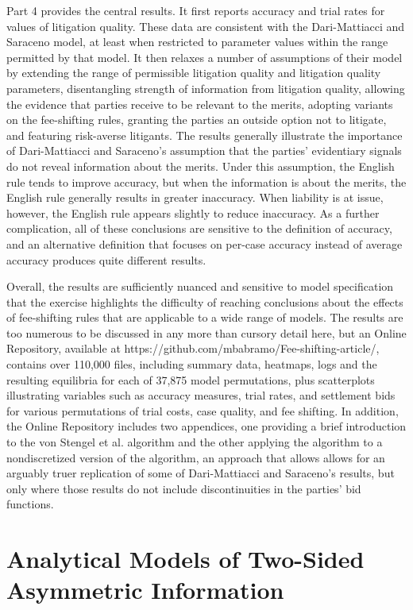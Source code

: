 \documentclass{article}
\begin{document}
Part 4 provides the central results. It first reports accuracy and trial rates for values of litigation quality. These data are consistent with the Dari-Mattiacci and Saraceno model, at least when restricted to parameter values within the range permitted by that model. It then relaxes a number of assumptions of their model by extending the range of permissible litigation quality and litigation quality parameters, disentangling strength of information from litigation quality, allowing the evidence that parties receive to be relevant to the merits, adopting variants on the fee-shifting rules, granting the parties an outside option not to litigate, and featuring risk-averse litigants. The results generally illustrate the importance of Dari-Mattiacci and Saraceno's assumption that the parties' evidentiary signals do not reveal information about the merits. Under this assumption, the English rule tends to improve accuracy, but when the information is about the merits, the English rule generally results in greater inaccuracy. When liability is at issue, however, the English rule appears slightly to reduce inaccuracy. As a further complication, all of these conclusions are sensitive to the definition of accuracy, and an alternative definition that focuses on per-case accuracy instead of average accuracy produces quite different results. 

Overall, the results are sufficiently nuanced and sensitive to model specification that the exercise highlights the difficulty of reaching conclusions about the effects of fee-shifting rules that are applicable to a wide range of models. The results are too numerous to be discussed in any more than cursory detail here, but an Online Repository, available at https://github.com/mbabramo/Fee-shifting-article/, contains over 110,000 files, including summary data, heatmaps, logs and the resulting equilibria for each of 37,875 model permutations, plus scatterplots illustrating variables such as accuracy measures, trial rates, and settlement bids for various permutations of trial costs, case quality, and fee shifting. In addition, the Online Repository includes two appendices, one providing a brief introduction to the von Stengel et al. algorithm and the other applying the algorithm to a nondiscretized version of the algorithm, an approach that allows allows for an arguably truer replication of some of Dari-Mattiacci and Saraceno's results, but only where those results do not include discontinuities in the parties' bid functions.

\section{Analytical Models of Two-Sided Asymmetric Information}
\end{document}
